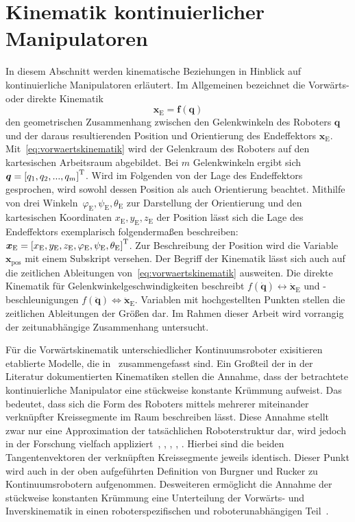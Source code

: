 \pagebreak
\section{Kinematik kontinuierlicher Manipulatoren}
\label{sec:kinematikAllgemein}

In diesem Abschnitt werden kinematische Beziehungen in Hinblick auf kontinuierliche Manipulatoren erläutert. Im Allgemeinen bezeichnet die Vorwärts- oder direkte Kinematik 
%
\begin{equation}
\label{eq:vorwaertskinematik}
\bm{x}_\mathrm{E} = \bm{f}(\bm{q}) 
\end{equation}
%
den geometrischen Zusammenhang zwischen den Gelenkwinkeln des Roboters $\bm{q}$ und der daraus resultierenden Position und Orientierung des Endeffektors $\bm{x}_\mathrm{E}$. Mit~\eqref{eq:vorwaertskinematik} wird der Gelenkraum des Roboters auf den kartesischen Arbeitsraum abgebildet. Bei $m$ Gelenkwinkeln ergibt sich $\bm{q} = \left[q_1, q_2, ..., q_m \right]^{\mathrm{T}}$. Wird im Folgenden von der Lage des Endeffektors gesprochen, wird sowohl dessen Position als auch Orientierung beachtet. 
Mithilfe von drei \mbox{Winkeln $\varphi_\mathrm{E}, \psi_\mathrm{E}, \theta_\mathrm{E}$} zur Darstellung der Orientierung und den kartesischen Koordinaten $x_\mathrm{E}, y_\mathrm{E}, z_\mathrm{E}$ der Position lässt sich die Lage des Endeffektors exemplarisch folgendermaßen beschreiben: \mbox{$\bm{x}_\mathrm{E} = \left[x_\mathrm{E}, y_\mathrm{E}, z_\mathrm{E}, \varphi_\mathrm{E}, \psi_\mathrm{E}, \theta_\mathrm{E} \right]^{\mathrm{T}} $}. Zur Beschreibung der Position wird die Variable $\bm{x}_{\mathrm{pos}}$ mit einem Subskript versehen. 
Der Begriff der Kinematik lässt sich auch auf die zeitlichen Ableitungen von~\eqref{eq:vorwaertskinematik} ausweiten. Die direkte Kinematik für Gelenkwinkelgeschwindigkeiten beschreibt $f(\bm{\dot{q}}) \leftrightarrow \bm{\dot{x}}_\mathrm{E} $ und -beschleunigungen $f(\bm{\ddot{q}}) \Leftrightarrow \bm{\ddot{x}}_\mathrm{E}$. Variablen mit hochgestellten Punkten stellen die zeitlichen Ableitungen der Größen dar. 
Im Rahmen dieser Arbeit wird vorrangig der zeitunabhängige Zusammenhang untersucht. 

Für die Vorwärtskinematik unterschiedlicher Kontinuumsroboter exisitieren etablierte Modelle, die in~\cite{WIJ10} zusammengefasst sind.
Ein Großteil der in der Literatur dokumentierten Kinematiken stellen die Annahme, dass der betrachtete kontinuierliche Manipulator eine stückweise konstante Krümmung aufweist. 
Das bedeutet, dass sich die Form des Roboters mittels mehrerer miteinander verknüpfter Kreissegmente im Raum beschreiben lässt. Diese Annahme stellt zwar nur eine Approximation der tatsächlichen Roboterstruktur dar, wird jedoch in der Forschung vielfach appliziert~\cite{HW03}, \cite{STF04}, \cite{JW06a}, \cite{RJWRC09}, \cite{DLIB10}. Hierbei sind die beiden Tangentenvektoren der verknüpften Kreissegmente jeweils identisch. Dieser Punkt wird auch in der oben aufgeführten Definition von Burgner und Rucker zu Kontinuumsrobotern aufgenommen.
Desweiteren ermöglicht die Annahme der stückweise konstanten Krümmung eine Unterteilung der Vorwärts- und Inverskinematik in einen roboterspezifischen und roboterunabhängigen Teil~\cite{WIJ10}. 

